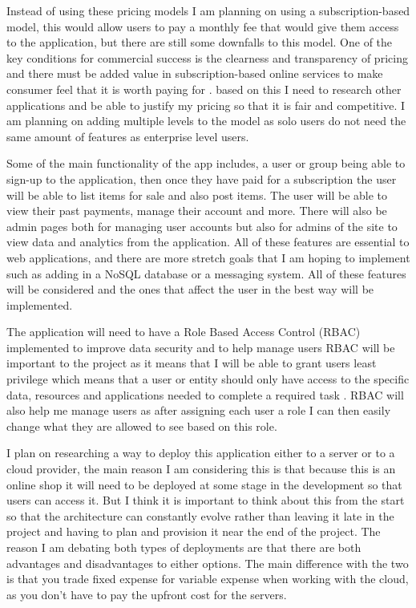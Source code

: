 \documentclass[]{project_report}
\begin{document}
Instead of using these pricing models I am planning on using a subscription-based model, this would allow users to pay a monthly fee that would give them access to the application, but there are still some downfalls to this model. One of the key conditions for commercial success is the clearness and transparency of pricing \cite{laatikainen_2014} and there must be added value in subscription-based online services to make consumer feel that it is worth paying for \cite{wang_2024}. based on this I need to research other applications and be able to justify my pricing so that it is fair and competitive. I am planning on adding multiple levels to the model as solo users do not need the same amount of features as enterprise level users.

Some of the main functionality of the app includes, a user or group being able to sign-up to the application, then once they have paid for a subscription the user will be able to list items for sale and also post items. The user will be able to view their past payments, manage their account and more. There will also be admin pages both for managing user accounts but also for admins of the site to view data and analytics from the application. All of these features are essential to web applications, and there are more stretch goals that I am hoping to implement such as adding in a NoSQL database or a messaging system. All of these features will be considered and the ones that affect the user in the best way will be implemented.

The application will need to have a Role Based Access Control (RBAC) implemented to improve data security and to help manage users \cite{herzberg_2023} RBAC will be important to the project as it means that I will be able to grant users least privilege which means that a user or entity should only have access to the specific data, resources and applications needed to complete a required task \cite{palo_alto}. RBAC will also help me manage users as after assigning each user a role I can then easily change what they are allowed to see based on this role. 


I plan on researching a way to deploy this application either to a server or to a cloud provider, the main reason I am considering this is that because this is an online shop it will need to be deployed at some stage in the development so that users can access it. But I think it is important to think about this from the start so that the architecture can constantly evolve rather than leaving it late in the project and having to plan and provision it near the end of the project. The reason I am debating both types of deployments are that there are both advantages and disadvantages to either options. The main difference with the two is that you trade fixed expense for variable expense \cite{whitepaper_2024} when working with the cloud, as you don't have to pay the upfront cost for the servers.
\end{document}
